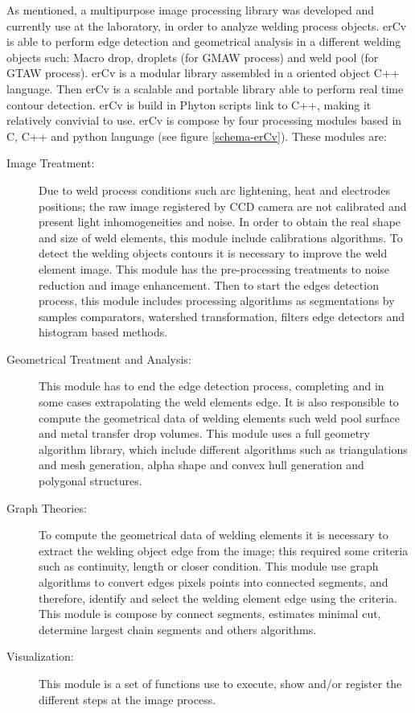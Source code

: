 \begin{Segmentation}
As mentioned, a multipurpose image processing library was developed
 and currently use at the laboratory, in order to analyze welding
 process objects.
erCv is able to perform edge detection and geometrical analysis
 in a different welding objects such: Macro drop, droplets 
(for GMAW process) and weld pool (for GTAW process).
erCv is a modular library assembled in a oriented object C++ 
language. Then erCv is a scalable and portable library able 
to perform real time contour detection. erCv is build in Phyton 
scripts link to C++, making it relatively convivial to use.
erCv is compose by four processing modules based in C,  
C++ and python language (see figure \ref{schema-erCv}). These modules are: 
\begin{description}
\item[Image Treatment:] Due to weld process conditions such
 arc lightening, heat and electrodes positions; the raw image
 registered by CCD camera are not calibrated and present light
 inhomogeneities and noise. In order to obtain the real shape
 and size of weld elements, this module include calibrations
 algorithms. To detect the welding objects contours it is necessary
 to improve the weld element image. This module has the pre-processing
 treatments to noise reduction and image enhancement. Then to start
 the edges detection process, this module includes processing 
algorithms as segmentations by samples comparators, watershed
 transformation, filters edge detectors and histogram based
 methods.  
\item[Geometrical Treatment and Analysis:] This module has 
to end the edge detection process, completing and in some 
cases extrapolating the weld elements edge. It is also 
responsible to compute the geometrical data of welding 
elements such weld pool surface and metal transfer drop 
volumes. This module uses a full geometry algorithm library,
 which include different algorithms such as triangulations 
and mesh generation, alpha shape and convex hull generation
 and polygonal structures.
\item[Graph Theories:] To compute the geometrical data of
 welding elements it is necessary to extract the welding 
object edge from the image; this required some criteria 
such as continuity, length or closer condition.  This module 
use graph algorithms to convert edges pixels points into 
connected segments, and therefore, identify and select the 
welding element edge using the criteria. This module is compose
 by connect segments, estimates minimal cut, determine largest
 chain segments and others algorithms. 
\item[Visualization:] This module is a set of functions use
 to execute, show and/or register the different steps at the
 image process.
\end{description}


\end{Segmentation}
